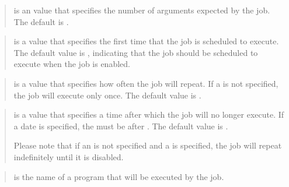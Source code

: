 \documentclass[letterpaper,10pt,english,openany,oneside]{sphinxmanual}
\begin{document}
\begin{quote}

 is an  value that specifies the
number of arguments expected by the job. The default is .
\end{quote}

\begin{quote}

 is a  value that specifies the
first time that the job is scheduled to execute. The default value
is , indicating that the job should be scheduled to execute when
the job is enabled.
\end{quote}

\begin{quote}

 is a  value that specifies how often the
job will repeat. If a  is not specified, the job
will execute only once. The default value is .
\end{quote}

\begin{quote}

 is a  value that specifies a
time after which the job will no longer execute. If a date is
specified, the  must be after . The default
value is .

Please note that if an  is not specified and a
 is specified, the job will repeat indefinitely
until it is disabled.
\end{quote}

\begin{quote}

 is the name of a program that will be executed by
the job.
\end{quote}
\end{document}
